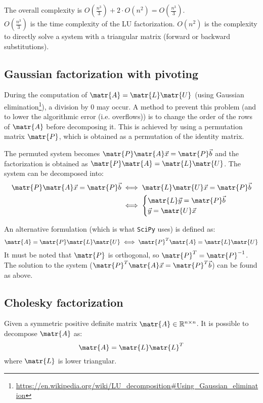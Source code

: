 The overall complexity is $O(\frac{n^3}{3}) + 2 \cdot O(n^2) = O(\frac{n^3}{3})$.\\
$O(\frac{n^3}{3})$ is the time complexity of the LU factorization. 
$O(n^2)$ is the complexity to directly solve a system with a triangular matrix (forward or backward substitutions).


\subsection{Gaussian factorization with pivoting}
During the computation of $\matr{A} = \matr{L}\matr{U}$ 
(using Gaussian elimination\footnote{\url{https://en.wikipedia.org/wiki/LU\_decomposition\#Using\_Gaussian\_elimination}}), 
a division by 0 may occur.
A method to prevent this problem (and to lower the algorithmic error (i.e. overflows)) is to change the order of the rows of $\matr{A}$ before decomposing it.
This is achieved by using a permutation matrix $\matr{P}$, which is obtained as a permutation of the identity matrix.

The permuted system becomes $\matr{P}\matr{A}\vec{x} = \matr{P}\vec{b}$ and the factorization is obtained as $\matr{P}\matr{A} = \matr{L}\matr{U}$.
The system can be decomposed into:
\[
    \begin{split}
        \matr{P}\matr{A}\vec{x} = \matr{P}\vec{b} & \iff \matr{L}\matr{U}\vec{x} = \matr{P}\vec{b} \\
            & \iff 
            \begin{cases}
                \matr{L}\vec{y} = \matr{P}\vec{b} \\
                \vec{y} = \matr{U}\vec{x}
            \end{cases}
    \end{split}
\]

An alternative formulation (which is what \texttt{SciPy} uses) 
is defined as:
\[\matr{A} = \matr{P}\matr{L}\matr{U} \iff \matr{P}^T\matr{A} = \matr{L}\matr{U} \]
It must be noted that $\matr{P}$ is orthogonal, so $\matr{P}^T = \matr{P}^{-1}$.
The solution to the system ($\matr{P}^T\matr{A}\vec{x} = \matr{P}^T\vec{b}$) can be found as above.


\subsection{Cholesky factorization}
Given a symmetric positive definite matrix $\matr{A} \in \mathbb{R}^{n \times n}$.
It is possible to decompose $\matr{A}$ as:
\[ \matr{A} = \matr{L}\matr{L}^T \]
where $\matr{L}$ is lower triangular.

